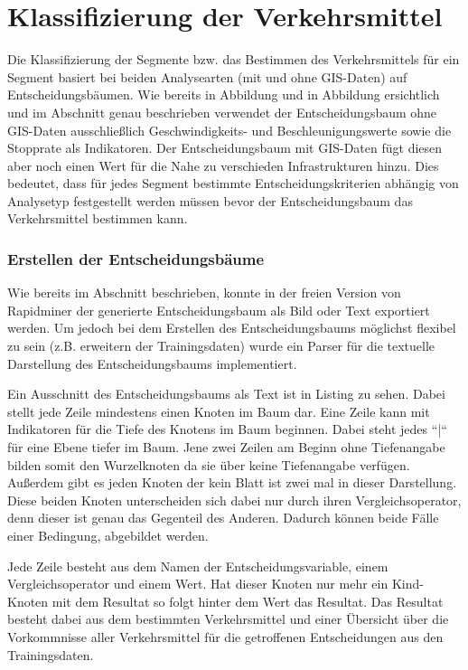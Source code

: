 \section{Klassifizierung der Verkehrsmittel}
Die Klassifizierung der Segmente bzw. das Bestimmen des Verkehrsmittels für ein Segment basiert bei beiden Analysearten (mit und ohne GIS-Daten) auf Entscheidungsbäumen. Wie bereits in Abbildung  und in Abbildung  ersichtlich und im Abschnitt  genau beschrieben verwendet der Entscheidungsbaum ohne GIS-Daten ausschließlich Geschwindigkeits- und Beschleunigungswerte sowie die Stopprate als Indikatoren. Der Entscheidungsbaum mit GIS-Daten fügt diesen aber noch einen Wert für die Nahe zu verschieden Infrastrukturen hinzu. Dies bedeutet, dass für jedes Segment bestimmte Entscheidungskriterien abhängig von Analysetyp festgestellt werden müssen bevor der Entscheidungsbaum das Verkehrsmittel bestimmen kann. 

\subsubsection{Erstellen der Entscheidungsbäume}
\label{entscheidungsbaumGenerierungPHP}
Wie bereits im Abschnitt  beschrieben, konnte in der freien Version von Rapidminer der generierte Entscheidungsbaum als Bild oder Text exportiert werden. Um jedoch bei dem Erstellen des Entscheidungsbaums möglichst flexibel zu sein (z.B. erweitern der Trainingsdaten) wurde ein Parser für die textuelle Darstellung des Entscheidungsbaums implementiert. 

Ein Ausschnitt des Entscheidungsbaums als Text ist in Listing  zu sehen. Dabei stellt jede Zeile mindestens einen Knoten im Baum dar. Eine Zeile kann mit Indikatoren für die Tiefe des Knotens im Baum beginnen. Dabei steht jedes ``|`` für eine Ebene tiefer im Baum. Jene zwei Zeilen am Beginn ohne Tiefenangabe bilden somit den Wurzelknoten da sie über keine Tiefenangabe verfügen. Außerdem gibt es jeden Knoten der kein Blatt ist zwei mal in dieser Darstellung. Diese beiden Knoten unterscheiden sich dabei nur durch ihren Vergleichsoperator, denn dieser ist genau das Gegenteil des Anderen. Dadurch können beide Fälle einer Bedingung, abgebildet werden.

Jede Zeile besteht aus dem Namen der Entscheidungsvariable, einem Vergleichsoperator und einem Wert. Hat dieser Knoten nur mehr ein Kind-Knoten mit dem Resultat so folgt hinter dem Wert das Resultat. Das Resultat besteht dabei aus dem bestimmten Verkehrsmittel und einer Übersicht über die Vorkommnisse aller Verkehrsmittel für die getroffenen Entscheidungen aus den Trainingsdaten.

